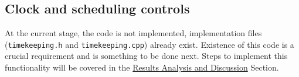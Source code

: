 \subsection{Clock and scheduling controls}
At the current stage, the code is not implemented, implementation files (\texttt{timekeeping.h} and \texttt{timekeeping.cpp}) already exist. Existence of this code is a crucial requirement and is something to be done next. Steps to implement this functionality will be covered in the \hyperref[sec:discussion]{Results Analysis and Discussion} Section.
